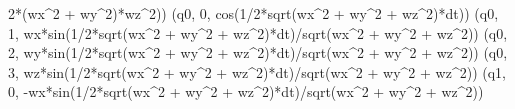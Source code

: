 \documentclass[]{article}
\newenvironment{Shaded}{}{}
\newcommand{\DecValTok}[1]{\textcolor[rgb]{0.25,0.63,0.44}{#1}}
\newcommand{\OperatorTok}[1]{\textcolor[rgb]{0.40,0.40,0.40}{#1}}
\newcommand{\NormalTok}[1]{#1}
\begin{document}
\begin{Shaded}
\begin{Highlighting}[]
\DecValTok{2}\OperatorTok{*}\NormalTok{(wx}\OperatorTok{^}\DecValTok{2} \OperatorTok{+}\NormalTok{ wy}\OperatorTok{^}\DecValTok{2}\NormalTok{)}\OperatorTok{*}\NormalTok{wz}\OperatorTok{^}\DecValTok{2}\NormalTok{))}
\NormalTok{(q0, }\DecValTok{0}\NormalTok{, cos(}\DecValTok{1}\OperatorTok{/}\DecValTok{2}\OperatorTok{*}\NormalTok{sqrt(wx}\OperatorTok{^}\DecValTok{2} \OperatorTok{+}\NormalTok{ wy}\OperatorTok{^}\DecValTok{2} \OperatorTok{+}\NormalTok{ wz}\OperatorTok{^}\DecValTok{2}\NormalTok{)}\OperatorTok{*}\NormalTok{dt))}
\NormalTok{(q0, }\DecValTok{1}\NormalTok{, wx}\OperatorTok{*}\NormalTok{sin(}\DecValTok{1}\OperatorTok{/}\DecValTok{2}\OperatorTok{*}\NormalTok{sqrt(wx}\OperatorTok{^}\DecValTok{2} \OperatorTok{+}\NormalTok{ wy}\OperatorTok{^}\DecValTok{2} \OperatorTok{+}\NormalTok{ wz}\OperatorTok{^}\DecValTok{2}\NormalTok{)}\OperatorTok{*}\NormalTok{dt)}\OperatorTok{/}\NormalTok{sqrt(wx}\OperatorTok{^}\DecValTok{2} \OperatorTok{+}\NormalTok{ wy}\OperatorTok{^}\DecValTok{2} \OperatorTok{+}\NormalTok{ wz}\OperatorTok{^}\DecValTok{2}\NormalTok{))}
\NormalTok{(q0, }\DecValTok{2}\NormalTok{, wy}\OperatorTok{*}\NormalTok{sin(}\DecValTok{1}\OperatorTok{/}\DecValTok{2}\OperatorTok{*}\NormalTok{sqrt(wx}\OperatorTok{^}\DecValTok{2} \OperatorTok{+}\NormalTok{ wy}\OperatorTok{^}\DecValTok{2} \OperatorTok{+}\NormalTok{ wz}\OperatorTok{^}\DecValTok{2}\NormalTok{)}\OperatorTok{*}\NormalTok{dt)}\OperatorTok{/}\NormalTok{sqrt(wx}\OperatorTok{^}\DecValTok{2} \OperatorTok{+}\NormalTok{ wy}\OperatorTok{^}\DecValTok{2} \OperatorTok{+}\NormalTok{ wz}\OperatorTok{^}\DecValTok{2}\NormalTok{))}
\NormalTok{(q0, }\DecValTok{3}\NormalTok{, wz}\OperatorTok{*}\NormalTok{sin(}\DecValTok{1}\OperatorTok{/}\DecValTok{2}\OperatorTok{*}\NormalTok{sqrt(wx}\OperatorTok{^}\DecValTok{2} \OperatorTok{+}\NormalTok{ wy}\OperatorTok{^}\DecValTok{2} \OperatorTok{+}\NormalTok{ wz}\OperatorTok{^}\DecValTok{2}\NormalTok{)}\OperatorTok{*}\NormalTok{dt)}\OperatorTok{/}\NormalTok{sqrt(wx}\OperatorTok{^}\DecValTok{2} \OperatorTok{+}\NormalTok{ wy}\OperatorTok{^}\DecValTok{2} \OperatorTok{+}\NormalTok{ wz}\OperatorTok{^}\DecValTok{2}\NormalTok{))}
\NormalTok{(q1, }\DecValTok{0}\NormalTok{, }\OperatorTok{-}\NormalTok{wx}\OperatorTok{*}\NormalTok{sin(}\DecValTok{1}\OperatorTok{/}\DecValTok{2}\OperatorTok{*}\NormalTok{sqrt(wx}\OperatorTok{^}\DecValTok{2} \OperatorTok{+}\NormalTok{ wy}\OperatorTok{^}\DecValTok{2} \OperatorTok{+}\NormalTok{ wz}\OperatorTok{^}\DecValTok{2}\NormalTok{)}\OperatorTok{*}\NormalTok{dt)}\OperatorTok{/}\NormalTok{sqrt(wx}\OperatorTok{^}\DecValTok{2} \OperatorTok{+}\NormalTok{ wy}\OperatorTok{^}\DecValTok{2} \OperatorTok{+}\NormalTok{ wz}\OperatorTok{^}\DecValTok{2}\NormalTok{))}

\end{Highlighting}
\end{Shaded}
\end{document}
